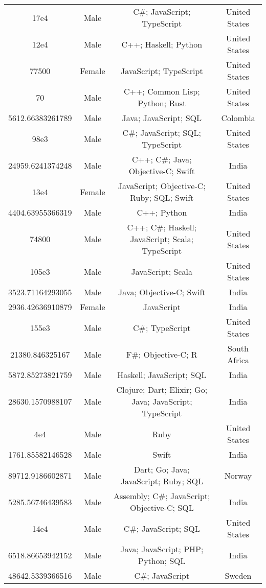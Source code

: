 \begin{center}
\begin{tabular}{ |c|c|c|c| }
17e4  &  Male  &  C\#; JavaScript; TypeScript  &  United States  \\ 
12e4  &  Male  &  C++; Haskell; Python  &  United States  \\ 
77500  &  Female  &  JavaScript; TypeScript  &  United States  \\ 
70  &  Male  &  C++; Common Lisp; Python; Rust  &  United States  \\ 
5612.66383261789  &  Male  &  Java; JavaScript; SQL  &  Colombia  \\ 
98e3  &  Male  &  C\#; JavaScript; SQL; TypeScript  &  United States  \\ 
24959.6241374248  &  Male  &  C++; C\#; Java; Objective-C; Swift  &  India  \\ 
13e4  &  Female  &  JavaScript; Objective-C; Ruby; SQL; Swift  &  United States  \\ 
4404.63955366319  &  Male  &  C++; Python  &  India  \\ 
74800  &  Male  &  C++; C\#; Haskell; JavaScript; Scala; TypeScript  &  United States  \\ 
105e3  &  Male  &  JavaScript; Scala  &  United States  \\ 
3523.71164293055  &  Male  &  Java; Objective-C; Swift  &  India  \\ 
2936.42636910879  &  Female  &  JavaScript  &  India  \\ 
155e3  &  Male  &  C\#; TypeScript  &  United States  \\ 
21380.846325167  &  Male  &  F\#; Objective-C; R  &  South Africa  \\ 
5872.85273821759  &  Male  &  Haskell; JavaScript; SQL  &  India  \\ 
28630.1570988107  &  Male  &  Clojure; Dart; Elixir; Go; Java; JavaScript; TypeScript  &  India  \\ 
4e4  &  Male  &  Ruby  &  United States  \\ 
1761.85582146528  &  Male  &  Swift  &  India  \\ 
89712.9186602871  &  Male  &  Dart; Go; Java; JavaScript; Ruby; SQL  &  Norway  \\ 
5285.56746439583  &  Male  &  Assembly; C\#; JavaScript; Objective-C; SQL  &  India  \\ 
14e4  &  Male  &  C\#; JavaScript; SQL  &  United States  \\ 
6518.86653942152  &  Male  &  Java; JavaScript; PHP; Python; SQL  &  India  \\ 
48642.5339366516  &  Male  &  C\#; JavaScript  &  Sweden  \\ 

\end{tabular}
\end{center}
